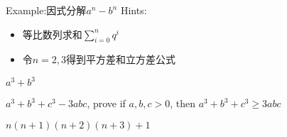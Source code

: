 \clearpage
Example:因式分解$a^n-b^n$ 
\clearpage
Hints:
\begin{itemize}
\item 等比数列求和$\sum_{i=0}^nq^i$
\item 令$n=2,3$得到平方差和立方差公式
\end{itemize}

\clearpage
$a^3+b^3$

$a^3+b^3+c^3-3abc$, prove if $a,b,c>0$, then $a^3+b^3+c^3\geq 3abc$

$n(n+1)(n+2)(n+3)+1$






